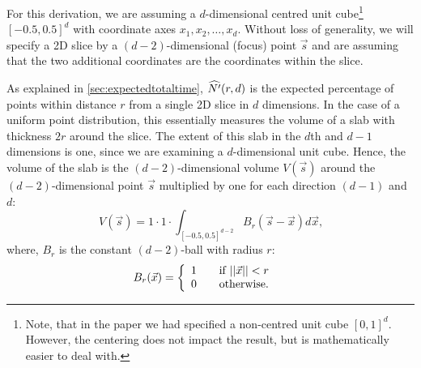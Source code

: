 
\providecommand{\vu}[0]{\vec{u}}
\providecommand{\vv}[0]{\vec{v}}
\providecommand{\vbv}[0]{\vec{\bar{v}}}
\providecommand{\vw}[0]{\vec{w}}
\providecommand{\vx}[0]{\vec{x}}
\providecommand{\vs}[0]{\vec{s}}
\providecommand{\vp}[0]{\vec{p}}

\providecommand{\vsigma}[0]{\vec{\sigma}}
\providecommand{\vvarphi}[0]{\vec{\varphi}}
\providecommand{\vbvarphi}[0]{\vec{\bar{\varphi}}}
\providecommand{\vPhi}[0]{\vec{\Phi}}
\providecommand{\btau}[0]{\bar{\tau}}


For this derivation, we are assuming a $d$-dimensional centred unit cube\footnote{Note, that in the paper we had specified a non-centred unit cube $[0, 1]^d$. However, the centering does not impact the result, but is mathematically easier to deal with.} $[-0.5, 0.5]^d$ with coordinate axes $x_1, x_2, \ldots, x_d$. Without loss of generality, we will specify a 2D slice by a $(d-2)$-dimensional (focus) point $\vs$ and are assuming that the two additional coordinates are the coordinates within the slice.

As explained in \autoref{sec:expectedtotaltime}, $\widehat{N'}(r, d)$ is the expected percentage of points within distance $r$ from a single 2D slice in $d$ dimensions. In the case of a uniform point distribution, this essentially measures the volume of a slab with thickness $2r$ around the slice. The extent of this slab in the $d$th and $d-1$ dimensions is one, since we are examining a $d$-dimensional unit cube. Hence, the volume of the slab is the $(d-2)$-dimensional volume $V(\vs)$ around the $(d-2)$-dimensional point $\vs$ multiplied by one for each direction $(d-1)$ and $d$:
\begin{equation}
  V(\vs) = 1 \cdot 1 \cdot \int_{[-0.5,0.5]^{d-2}} B_r(\vs-\vx) d\vx \text{,}
   \label{eq:vs}
\end{equation}
where, $B_r$ is the constant $(d-2)$-ball with radius $r$:
\begin{align*}
  B_r(\vx) &= \left\{ 
  \begin{array}{l l}
    1 & \quad \text{if $||\vx||<r$}\\
    0 & \quad \text{otherwise} \text{.}\\
  \end{array} \right. 
\end{align*}


